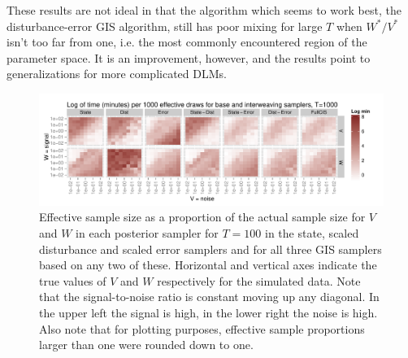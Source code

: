\documentclass{article}\usepackage{graphicx, color}
\newenvironment{knitrout}{}{} %
\begin{document}
These results are not ideal in that the algorithm which seems to work best, the disturbance-error GIS algorithm, still has poor mixing for large $T$ when $W^*/V^*$ isn't too far from one, i.e. the most commonly encountered region of the parameter space. It is an improvement, however, and the results point to generalizations for more complicated DLMs. 





\begin{knitrout}
\color{fgcolor}\begin{figure}[!ht]


{\centering \includegraphics[width=.75\textwidth]{figure/plot} 

}

\caption[\footnotesize Effective sample size as a proportion of the actual sample size for $V$ and $W$ in each posterior sampler for $T=100$ in the state, scaled disturbance and scaled error samplers and for all three GIS samplers based on any two of these]{\footnotesize Effective sample size as a proportion of the actual sample size for $V$ and $W$ in each posterior sampler for $T=100$ in the state, scaled disturbance and scaled error samplers and for all three GIS samplers based on any two of these. Horizontal and vertical axes indicate the true values of $V$ and $W$ respectively for the simulated data. Note that the signal-to-noise ratio is constant moving up any diagonal. In the upper left the signal is high, in the lower right the noise is high. Also note that for plotting purposes, effective sample proportions larger than one were rounded down to one.\label{plot}}
\end{figure}


\end{knitrout}




\end{document}
